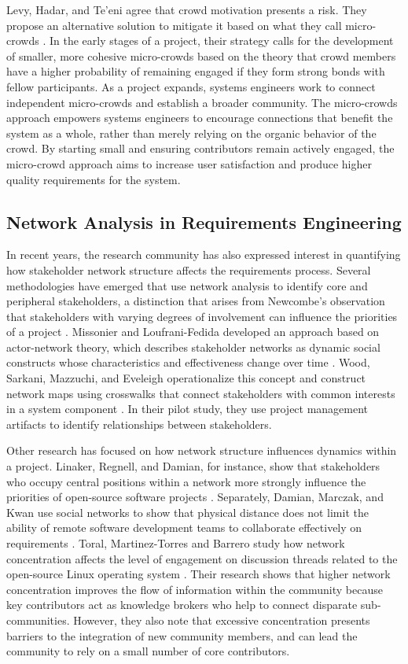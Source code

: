 Levy, Hadar, and Te'eni agree that crowd motivation presents a risk. They propose an alternative solution to mitigate it based on what they call micro-crowds \cite{levy}. In the early stages of a project, their strategy calls for the development of smaller, more cohesive micro-crowds based on the theory that crowd members have a higher probability of remaining engaged if they form strong bonds with fellow participants. As a project expands, systems engineers work to connect independent micro-crowds and establish a broader community. The micro-crowds approach empowers systems engineers to encourage connections that benefit the system as a whole, rather than merely relying on the organic behavior of the crowd. By starting small and ensuring contributors remain actively engaged, the micro-crowd approach aims to increase user satisfaction and produce higher quality requirements for the system.

\subsection{Network Analysis in Requirements Engineering}
\label{network_re}

In recent years, the research community has also expressed interest in quantifying how stakeholder network structure affects the requirements process. Several methodologies have emerged that use network analysis to identify core and peripheral stakeholders, a distinction that arises from Newcombe's observation that stakeholders with varying degrees of involvement can influence the priorities of a project \cite{newcombe}. Missonier and Loufrani-Fedida developed an approach based on actor-network theory, which describes stakeholder networks as dynamic social constructs whose characteristics and effectiveness change over time \cite{missonier}. Wood, Sarkani, Mazzuchi, and Eveleigh operationalize this concept and construct network maps using crosswalks that connect stakeholders with common interests in a system component \cite{wood}. In their pilot study, they use project management artifacts to identify relationships between stakeholders. 

Other research has focused on how network structure influences dynamics within a project. Linaker, Regnell, and Damian, for instance, show that stakeholders who occupy central positions within a network more strongly influence the priorities of open-source software projects \cite{linaker}. Separately, Damian, Marczak, and Kwan use social networks to show that physical distance does not limit the ability of remote software development teams to collaborate effectively on requirements \cite{damian}. Toral, Martinez-Torres and Barrero study how network concentration affects the level of engagement on discussion threads related to the open-source Linux operating system \cite{toral}. Their research shows that higher network concentration improves the flow of information within the community because key contributors act as knowledge brokers who help to connect disparate sub-communities. However, they also note that excessive concentration presents barriers to the integration of new community members, and can lead the community to rely on a small number of core contributors.

